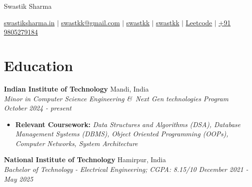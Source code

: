 \documentclass[7pt, legalpaper]{article}
\begin{document}
\pagestyle{empty} 


\begin{center}
\Huge {Swastik Sharma}
\end{center}

\begin{center}
\href{https://www.swastiksharma.in}{\raisebox{-0.05\height}{\faGlobe} swastiksharma.in} $|$ 
\href{mailto:swastkk@gmail.com}{\raisebox{-0.05\height}{\faEnvelope} swastkk@gmail.com} $|$ 
\href{https://github.com/swastkk}{\raisebox{-0.05\height}{\faGithub} swastkk} $|$ 
\href{https://linkedin.com/in/swastkk}{\raisebox{-0.05\height}{\faLinkedin} swastkk} $|$ 
\href{https://leetcode.com/swastiksharma}{\raisebox{-0.05\height}{\faCode} Leetcode} $|$ 
\href{tel:+919805279184}{\raisebox{-0.05\height}{\faMobile} +91 9805279184}

\end{center}

\section{Education}
\textbf{Indian Institute of Technology}  \hfill {Mandi, India}  \\
    \textit{{Minor in Computer Science Engineering \&\ Next Gen technologies Program} \hfill {October 2024 - present}}
  \begin{itemize}[leftmargin=*,label=$\diamond$]
    \item \small \textbf{Relevant Coursework:} \textit{Data Structures and Algorithms (DSA), Database Management Systems (DBMS), Object Oriented Programming (OOPs),  Computer Networks, System Architecture}
\end{itemize}
 \textbf{National Institute of Technology}  \hfill {Hamirpur, India}  \\
    \textit{{Bachelor of Technology - Electrical Engineering; CGPA: 8.15/10} \hfill {December 2021 - May 2025}}
\end{document}
